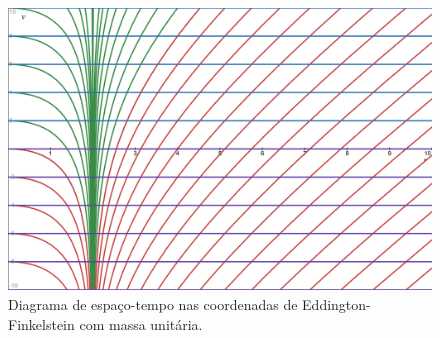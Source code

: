 \begin{figure}[ht]
    \centering
    \includegraphics[width=0.6\linewidth]{finkelstein.png}
    \caption{Diagrama de espaço-tempo nas coordenadas de Eddington-Finkelstein com massa unitária.}
    \label{fig:finkelstein}
\end{figure}
